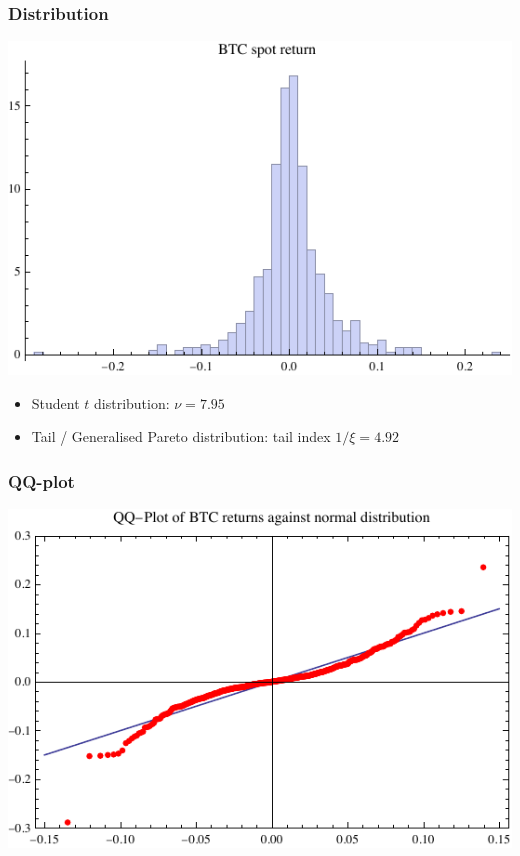 \documentclass[10pt,mathserif,notes=show]{beamer}
\renewcommand{\(}{\begin{columns}}
\renewcommand{\)}{\end{columns}}
\newcommand{\<}[1]{\begin{column}{#1}}
\renewcommand{\>}{\end{column}}
\theoremstyle{definition}
\begin{document}
\begin{frame}
  \frametitle{Distribution}
  \begin{center}
    \includegraphics[scale=1]{../_pics/btc_hist.pdf}
  \end{center}
  \begin{itemize}
  \item Student $t$ distribution: $\nu=7.95$
  \item Tail / Generalised Pareto distribution: tail index $1/\xi=4.92$ 
  \end{itemize}
\end{frame}

\begin{frame}
  \frametitle{QQ-plot}
  \begin{center}
    \includegraphics[scale=1]{../_pics/btc_qq.pdf}
  \end{center}
\end{frame}
\end{document}
